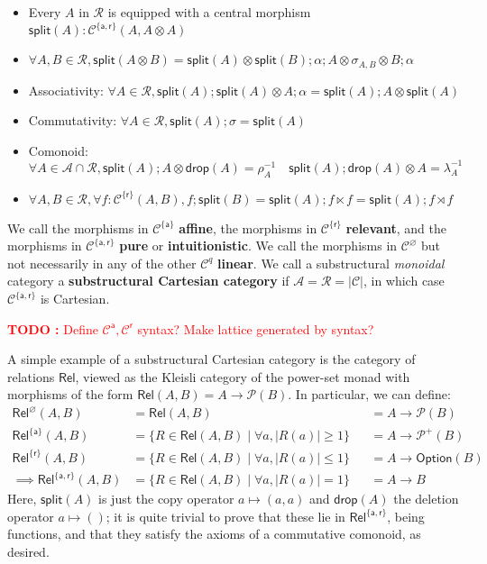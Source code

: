 \documentclass[acmsmall,screen,review]{acmart}
\newcounter{todos}
\newcommand{\TODO}[1]{{
  \stepcounter{todos}
  \begin{center}\large{\textcolor{red}{\textbf{TODO \arabic{todos}:} #1}}\end{center}
}}
\newcommand{\mc}[1]{\ensuremath{\mathcal{#1}}}
\newcommand{\ms}[1]{\ensuremath{\mathsf{#1}}}
\begin{document}
\begin{definition}
\begin{itemize}
\begin{itemize}
      \item Every \(A\) in \(\mc{R}\) is equipped with a central morphism \(\ms{split}(A): \mc{C}^{\{\ms{a}, \ms{r}\}}(A, A \otimes A)\)
      \item \(\forall A, B \in \mc{R}, \ms{split}(A \otimes B) = \ms{split}(A) \otimes \ms{split}(B);\alpha;A \otimes \sigma_{A, B} \otimes B;\alpha\)
      \item Associativity: \(\forall A \in \mc{R}, \ms{split}(A);\ms{split}(A) \otimes A;\alpha = \ms{split}(A);A \otimes \ms{split}(A)\)
      \item Commutativity: \(\forall A \in \mc{R}, \ms{split}(A);\sigma = \ms{split}(A)\)
      \item Comonoid: \(\forall A \in \mc{A} \cap \mc{R}, \ms{split}(A);A \otimes \ms{drop}(A) = \rho_A^{-1} \quad \ms{split}(A);\ms{drop}(A) \otimes A = \lambda_A^{-1}\)
      \item \(\forall A, B \in \mc{R}, \forall f: \mc{C}^{\{\ms{r}\}}(A, B), f;\ms{split}(B) = \ms{split}(A);f \ltimes f = \ms{split}(A);f\rtimes f\)
    \end{itemize}
  \end{itemize}
  We call the morphisms in \(\mc{C}^{\{\ms{a}\}}\) \textbf{affine}, the morphisms in \(\mc{C}^{\{\ms{r}\}}\) \textbf{relevant}, and the morphisms in \(\mc{C}^{\{\ms{a}, \ms{r}\}}\) \textbf{pure} or \textbf{intuitionistic}. We call the morphisms in \(\mc{C}^\varnothing\) but not necessarily in any of the other \(\mc{C}^q\) \textbf{linear}. We call a substructural \textit{monoidal} category a \textbf{substructural Cartesian category} if \(\mc{A} = \mc{R} = |\mc{C}|\), in which case \(\mc{C}^{\{\ms{a}, \ms{r}\}}\) is Cartesian.
\end{definition}
\TODO{Define \(\mc{C}^{\ms{a}}, \mc{C}^{\ms{r}}\) syntax? Make lattice generated by syntax?}
A simple example of a substructural Cartesian category is the category of relations \(\ms{Rel}\), viewed as the Kleisli category of the power-set monad with morphisms of the form \(\ms{Rel}(A, B) = A \to \mc{P}(B)\). In particular, we can define:
\begin{equation}
  \begin{aligned}
    \ms{Rel}^\varnothing(A, B) 
    &= \ms{Rel}(A, B) 
    &&= A \to \mc{P}(B) \\
    \ms{Rel}^{\{\ms{a}\}}(A, B) 
    &= \{R \in \ms{Rel}(A, B) \mid \forall a, |R(a)| \geq 1\} 
    &&= A \to \mc{P}^+(B) \\
    \ms{Rel}^{\{\ms{r}\}}(A, B) 
    &= \{R \in \ms{Rel}(A, B) \mid \forall a, |R(a)| \leq 1\} 
    &&= A \to \ms{Option}(B) \\
    \implies \ms{Rel}^{\{\ms{a}, \ms{r}\}}(A, B) 
    &= \{R \in \ms{Rel}(A, B) \mid \forall a, |R(a)| = 1\} 
    &&= A \to B
  \end{aligned}
\end{equation}
Here, \(\ms{split}(A)\) is just the copy operator \(a \mapsto (a, a)\) and \(\ms{drop}(A)\) the deletion operator \(a \mapsto ()\); it is quite trivial to prove that these lie in \(\ms{Rel}^{\{\ms{a}, \ms{r}\}}\), being functions, and that they satisfy the axioms of a commutative comonoid, as desired. 
\end{document}
